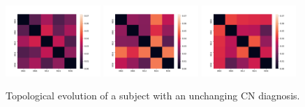 \documentclass{article}
\begin{document}
\begin{figure}
  \centering
  \includegraphics[width=0.32\textwidth]{figures/temporal_evolution/ADNI011S0023_h_0.png}
  \hfill \includegraphics[width=0.32\textwidth]{figures/temporal_evolution/ADNI011S0023_h_1.png}
  \hfill \includegraphics[width=0.32\textwidth]{figures/temporal_evolution/ADNI011S0023_h_2.png} \caption{Topological evolution of a subject with an unchanging CN diagnosis.}
  \label{fig:patient_evolution_stable}
\end{figure}
\end{document}
